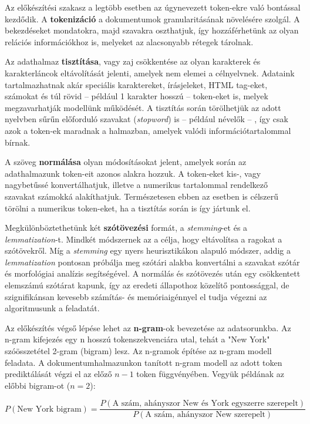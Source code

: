 Az előkészítési szakasz a legtöbb esetben az úgynevezett token-ekre való bontással kezdődik. A \textbf{tokenizáció} a dokumentumok granularitásának növelésére szolgál. A bekezdéseket mondatokra, majd szavakra oszthatjuk, így hozzáférhetünk az olyan relációs információkhoz is, melyeket az alacsonyabb rétegek tárolnak.

Az adathalmaz \textbf{tisztítása}, vagy zaj csökkentése az olyan karakterek és karakterláncok eltávolítását jelenti, amelyek nem elemei a célnyelvnek. Adataink tartalmazhatnak akár speciális karaktereket, írásjeleket, HTML tag-eket, számokat és túl rövid – például 1 karakter hosszú – token-eket is, melyek megzavarhatják modellünk működését. A tisztítás során törölhetjük az adott nyelvben sűrűn előforduló szavakat (\textit{stopword}) is – például névelők – , így csak azok a token-ek maradnak a halmazban, amelyek valódi információtartalommal bírnak.

A szöveg \textbf{normálása} olyan módosításokat jelent, amelyek során az adathalmazunk token-eit azonos alakra hozzuk. A token-eket kis-, vagy nagybetűssé konvertálhatjuk, illetve a numerikus tartalommal rendelkező szavakat számokká alakíthatjuk. Természetesen ebben az esetben is célszerű törölni a numerikus token-eket, ha a tisztítás során is így jártunk el.

Megkülönböztethetünk két \textbf{szótövezési} formát, a \textit{stemming}-et és a \textit{lemmatization}-t. Mindkét módszernek az a célja, hogy eltávolítsa a ragokat a szótövekről. Míg a \textit{stemming} egy nyers heurisztikákon alapuló módszer, addig a \textit{lemmatization} pontosan próbálja meg szótári alakba konvertálni a szavakat szótár és morfológiai analízis segítségével. A normálás és szótövezés után egy csökkentett elemszámú szótárat kapunk, így az eredeti állapothoz közelítő pontossággal, de szignifikánsan kevesebb számítás- és memóriaigénnyel el tudja végezni az algoritmusunk a feladatát.

Az előkészítés végső lépése lehet az \textbf{n-gram}-ok bevezetése az adatsorunkba. Az n-gram kifejezés egy n hosszú tokenszekvenciára utal, tehát a "New York" szóösszetétel 2-gram (bigram) lesz. Az n-gramok építése az n-gram modell feladata. A dokumentumhalmazunkon tanított n-gram modell az adott token prediktálását végzi el az előző $n-1$ token függvényében. Vegyük példának az előbbi bigram-ot ($n=2$):

\begin{equation}
\label{eq:n-grams}
P(\text{New York bigram}) = \frac{P(\text{A szám, ahányszor New és York egyszerre szerepelt})}{P(\text{A szám, ahányszor New szerepelt})}
\end{equation}

